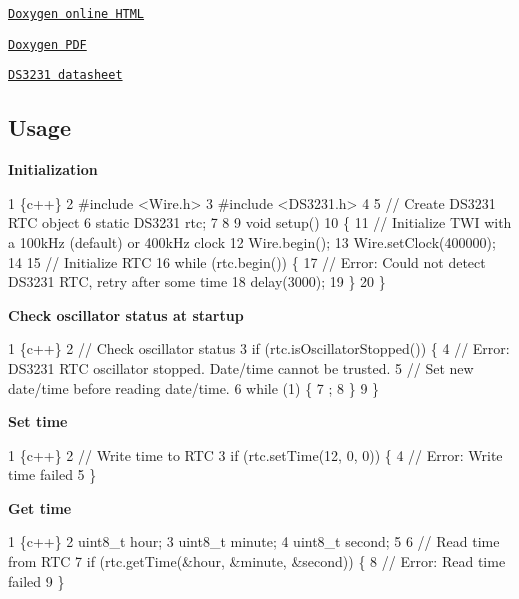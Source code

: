 \begin{DoxyItemize}
\item \href{https://erriez.github.io/ErriezDS3231}{\tt Doxygen online H\+T\+ML}
\item \href{https://github.com/Erriez/ErriezDS3231/raw/gh-pages/latex/ErriezDS3231.pdf}{\tt Doxygen P\+DF}
\item \href{https://github.com/Erriez/ErriezDS3231/blob/master/extras/DS3231.pdf}{\tt D\+S3231 datasheet}
\end{DoxyItemize}

\subsection*{Usage}

{\bfseries Initialization}


\begin{DoxyCode}
1 \{c++\}
2 #include <Wire.h>
3 #include <DS3231.h>
4 
5 // Create DS3231 RTC object
6 static DS3231 rtc;
7 
8 
9 void setup()
10 \{
11     // Initialize TWI with a 100kHz (default) or 400kHz clock
12     Wire.begin();
13     Wire.setClock(400000);
14 
15     // Initialize RTC
16     while (rtc.begin()) \{
17         // Error: Could not detect DS3231 RTC, retry after some time
18         delay(3000);
19     \}
20 \}
\end{DoxyCode}


{\bfseries Check oscillator status at startup}


\begin{DoxyCode}
1 \{c++\}
2 // Check oscillator status
3 if (rtc.isOscillatorStopped()) \{
4     // Error: DS3231 RTC oscillator stopped. Date/time cannot be trusted. 
5     // Set new date/time before reading date/time.
6     while (1) \{
7         ;
8     \}
9 \}
\end{DoxyCode}


{\bfseries Set time}


\begin{DoxyCode}
1 \{c++\}
2 // Write time to RTC
3 if (rtc.setTime(12, 0, 0)) \{
4     // Error: Write time failed
5 \}
\end{DoxyCode}


{\bfseries Get time}


\begin{DoxyCode}
1 \{c++\}
2 uint8\_t hour;
3 uint8\_t minute;
4 uint8\_t second;
5 
6 // Read time from RTC
7 if (rtc.getTime(&hour, &minute, &second)) \{
8     // Error: Read time failed
9 \}
\end{DoxyCode}


